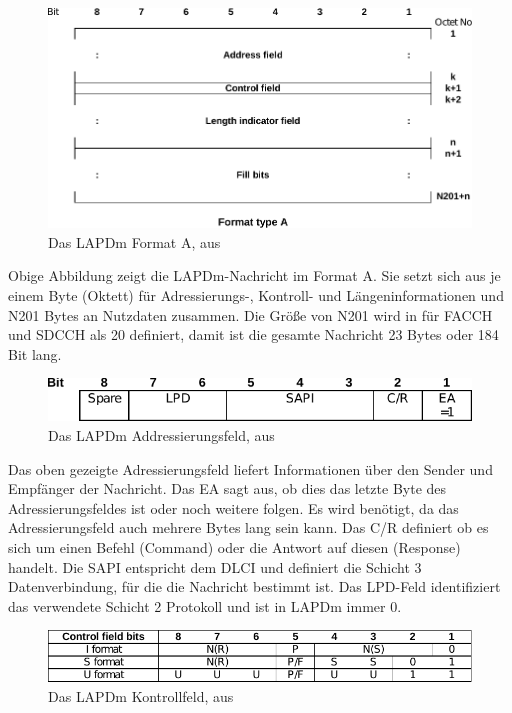 \begin{figure}[H]
	\centering \includegraphics[width=0.9\linewidth]{figures/0406_fig_1_pt_1.pdf}
	\caption[Das LAPDm Format A]{Das \ac{LAPDm} Format A, aus \citep[Abb. 1, Teil 1]{3gpp:04.06}} \label{fig:lapdm-format-a}
\end{figure}

Obige Abbildung zeigt die \ac{LAPDm}-Nachricht im Format A. Sie setzt sich aus je einem Byte (Oktett) für Adressierungs-, Kontroll- und Längeninformationen und N201 Bytes an Nutzdaten zusammen. Die Größe von N201 wird in  für \ac{FACCH} und \ac{SDCCH} als 20 definiert, damit ist die gesamte Nachricht 23 Bytes oder 184 Bit lang. 

\begin{figure}[H]
	\centering \includegraphics[width=0.8\linewidth]{figures/0406_fig_4.pdf}
	\caption[Das LAPDm Addressierungsfeld]{Das \ac{LAPDm} Addressierungsfeld, aus \citep[Abb. 4]{3gpp:04.06}} \label{fig:lapdm-format-addr}
\end{figure}

Das oben gezeigte Adressierungsfeld liefert Informationen über den Sender und Empfänger der Nachricht. Das \ac{EA} sagt aus, ob dies das letzte Byte des Adressierungsfeldes ist oder noch weitere folgen. Es wird benötigt, da das Adressierungsfeld auch mehrere Bytes lang sein kann. Das \ac{C/R} definiert ob es sich um einen Befehl (Command) oder die Antwort auf diesen (Response) handelt. Die \ac{SAPI} entspricht dem \ac{DLCI} und definiert die Schicht 3 Datenverbindung, für die die Nachricht bestimmt ist. Das \ac{LPD}-Feld identifiziert das verwendete Schicht 2 Protokoll und ist in \ac{LAPDm} immer 0.

\begin{figure}[H]
	\centering \includegraphics[width=0.8\linewidth]{figures/0406_tab_3.pdf}
	\caption[Das LAPDm Kontrollfeld]{Das \ac{LAPDm} Kontrollfeld, aus \citep[Tabelle 3]{3gpp:04.06}} \label{fig:lapdm-format-ctl}
\end{figure}

